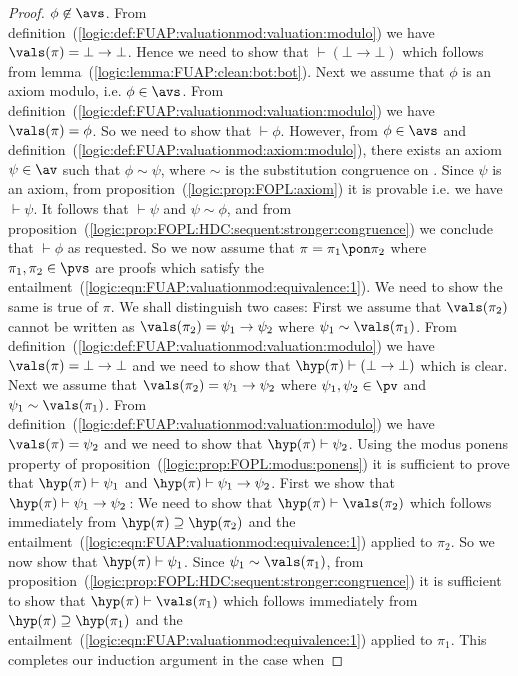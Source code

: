 \begin{proof}
$\phi\not\in\avs$. From
definition~(\ref{logic:def:FUAP:valuationmod:valuation:modulo}) we
have $\vals(\pi)=\bot\to\bot$. Hence we need to show that
$\vdash(\bot\to\bot)$ which follows from
lemma~(\ref{logic:lemma:FUAP:clean:bot:bot}). Next we assume that
$\phi$ is an axiom modulo, i.e. $\phi\in\avs$. From
definition~(\ref{logic:def:FUAP:valuationmod:valuation:modulo}) we
have $\vals(\pi)=\phi$. So we need to show that $\vdash\phi$.
However, from $\phi\in\avs$ and
definition~(\ref{logic:def:FUAP:valuationmod:axiom:modulo}), there
exists an axiom $\psi\in\av$ such that $\phi\sim\psi$, where $\sim$
is the substitution congruence on \pv. Since $\psi$ is an axiom,
from proposition~(\ref{logic:prop:FOPL:axiom}) it is provable i.e.
we have $\vdash\psi$. It follows that $\vdash\psi$ and
$\psi\sim\phi$, and from
proposition~(\ref{logic:prop:FOPL:HDC:sequent:stronger:congruence})
we conclude that $\vdash\phi$ as requested. So we now assume that
$\pi=\pi_{1}\pon\pi_{2}$ where $\pi_{1},\pi_{2}\in\pvs$ are proofs
which satisfy the
entailment~(\ref{logic:eqn:FUAP:valuationmod:equivalence:1}). We
need to show the same is true of $\pi$. We shall distinguish two
cases: First we assume that $\vals(\pi_{2})$ cannot be written as
$\vals(\pi_{2})=\psi_{1}\to\psi_{2}$ where
$\psi_{1}\sim\vals(\pi_{1})$. From
definition~(\ref{logic:def:FUAP:valuationmod:valuation:modulo}) we
have $\vals(\pi)=\bot\to\bot$ and we need to show that
$\hyp(\pi)\vdash(\bot\to\bot)$ which is clear. Next we assume that
$\vals(\pi_{2})=\psi_{1}\to\psi_{2}$ where $\psi_{1},\psi_{2}\in\pv$
and $\psi_{1}\sim\vals(\pi_{1})$. From
definition~(\ref{logic:def:FUAP:valuationmod:valuation:modulo}) we
have $\vals(\pi)=\psi_{2}$ and we need to show that
$\hyp(\pi)\vdash\psi_{2}$. Using the modus ponens property of
proposition~(\ref{logic:prop:FOPL:modus:ponens}) it is sufficient to
prove that $\hyp(\pi)\vdash\psi_{1}$ and
$\hyp(\pi)\vdash\psi_{1}\to\psi_{2}$. First we show that
$\hyp(\pi)\vdash\psi_{1}\to\psi_{2}$\,: We need to show that
$\hyp(\pi)\vdash\vals(\pi_{2})$ which follows immediately from
$\hyp(\pi)\supseteq\hyp(\pi_{2})$ and the
entailment~(\ref{logic:eqn:FUAP:valuationmod:equivalence:1}) applied
to $\pi_{2}$. So we now show that $\hyp(\pi)\vdash\psi_{1}$. Since
$\psi_{1}\sim\vals(\pi_{1})$, from
proposition~(\ref{logic:prop:FOPL:HDC:sequent:stronger:congruence})
it is sufficient to show that $\hyp(\pi)\vdash\vals(\pi_{1})$ which
follows immediately from $\hyp(\pi)\supseteq\hyp(\pi_{1})$ and the
entailment~(\ref{logic:eqn:FUAP:valuationmod:equivalence:1}) applied
to $\pi_{1}$. This completes our induction argument in the case when

\end{proof}
